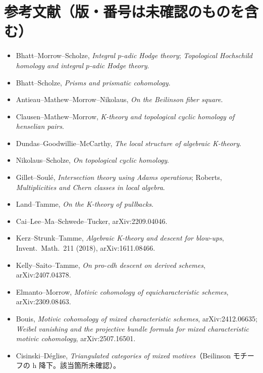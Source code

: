 \documentclass[11pt,a4paper]{ltjsarticle}
\theoremstyle{plain}
\theoremstyle{definition}
\theoremstyle{remark}
\begin{document}
\section*{参考文献（版・番号は未確認のものを含む）}
\begin{itemize}
  \item Bhatt--Morrow--Scholze, \emph{Integral $p$-adic Hodge theory}; \emph{Topological Hochschild homology and integral $p$-adic Hodge theory}.
  \item Bhatt--Scholze, \emph{Prisms and prismatic cohomology}.
  \item Antieau--Mathew--Morrow--Nikolaus, \emph{On the Beilinson fiber square}.
  \item Clausen--Mathew--Morrow, \emph{K-theory and topological cyclic homology of henselian pairs}.
  \item Dundas--Goodwillie--McCarthy, \emph{The local structure of algebraic K-theory}.
  \item Nikolaus--Scholze, \emph{On topological cyclic homology}.
  \item Gillet--Soulé, \emph{Intersection theory using Adams operations}; Roberts, \emph{Multiplicities and Chern classes in local algebra}.
  \item Land--Tamme, \emph{On the K-theory of pullbacks}.
  \item Cai--Lee--Ma--Schwede--Tucker, arXiv:2209.04046.
  \item Kerz--Strunk--Tamme, \emph{Algebraic K-theory and descent for blow-ups}, Invent.\ Math.\ 211 (2018), arXiv:1611.08466.
  \item Kelly--Saito--Tamme, \emph{On pro-cdh descent on derived schemes}, arXiv:2407.04378.
  \item Elmanto--Morrow, \emph{Motivic cohomology of equicharacteristic schemes}, arXiv:2309.08463.
  \item Bouis, \emph{Motivic cohomology of mixed characteristic schemes}, arXiv:2412.06635; \emph{Weibel vanishing and the projective bundle formula for mixed characteristic motivic cohomology}, arXiv:2507.16501.
  \item Cisinski--Déglise, \emph{Triangulated categories of mixed motives}（Beilinson モチーフの h 降下。該当箇所未確認）。
\end{itemize}
\end{document}
